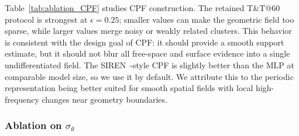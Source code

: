 \documentclass[lettersize,journal]{IEEEtran}
\begin{document}
\begin{table}[h]
\centering
\caption{Ablation studies of geometric field and CPF model, evaluated on Tanks \& Temples~\cite{tankstemples} with coverage gap of 60$^\circ$ using the retained T\&T@60 ablation protocol. Best results within each ablation block are in bold.}
\label{tab:ablation_CPF}
\end{table}

Table~\ref{tab:ablation_CPF} studies CPF construction. The retained T\&T@60 protocol is strongest at $\epsilon=0.25$; smaller values can make the geometric field too sparse, while larger values merge noisy or weakly related clusters. This behavior is consistent with the design goal of CPF: it should provide a smooth support estimate, but it should not blur all free-space and surface evidence into a single undifferentiated field. The SIREN~\cite{implicit}-style CPF is slightly better than the MLP at comparable model size, so we use it by default. We attribute this to the periodic representation being better suited for smooth spatial fields with local high-frequency changes near geometry boundaries.

\subsubsection{Ablation on \texorpdfstring{$\sigma_{\theta}$}{sigma-theta}}
\end{document}
